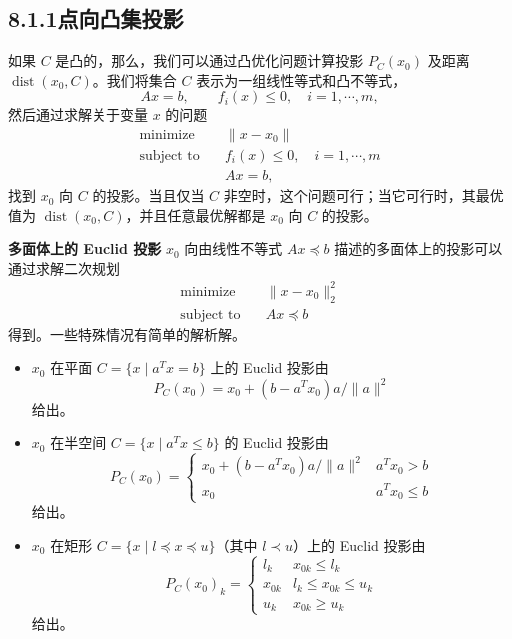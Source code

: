 \documentclass[UTF8,12pt,a4paper,fontset=fandol]{ctexart}
\begin{document}
\subsection*{8.1.1\quad 点向凸集投影}

如果 $C$ 是凸的，那么，我们可以通过凸优化问题计算投影 $P_C(x_0)$ 及距离 $\operatorname{dist}(x_0,C)$。我们将集合 $C$ 表示为一组线性等式和凸不等式，
\begin{equation}
Ax=b,\qquad f_i(x)\leq 0,\quad i=1,\cdots,m,
\tag{8.1}
\end{equation}
然后通过求解关于变量 $x$ 的问题
\begin{equation}
\begin{aligned}
\text{minimize}\quad & \|x-x_0\|\\
\text{subject to}\quad & f_i(x)\leq 0,\quad i=1,\cdots,m\\
& Ax=b,
\end{aligned}
\tag{8.2}
\end{equation}
找到 $x_0$ 向 $C$ 的投影。当且仅当 $C$ 非空时，这个问题可行；当它可行时，其最优值为 $\operatorname{dist}(x_0,C)$，并且任意最优解都是 $x_0$ 向 $C$ 的投影。

\noindent\textbf{多面体上的 Euclid 投影}\quad
$x_0$ 向由线性不等式 $Ax\preceq b$ 描述的多面体上的投影可以通过求解二次规划
\[
\begin{aligned}
\text{minimize}\quad & \|x-x_0\|_2^2\\
\text{subject to}\quad & Ax\preceq b
\end{aligned}
\]
得到。一些特殊情况有简单的解析解。

\begin{itemize}
\item $x_0$ 在平面 $C=\{x\mid a^T x=b\}$ 上的 Euclid 投影由
\[
P_C(x_0)=x_0+(b-a^Tx_0)a/\|a\|^2
\]
给出。

\item $x_0$ 在半空间 $C=\{x\mid a^T x\leq b\}$ 的 Euclid 投影由
\[
P_C(x_0)=
\begin{cases}
x_0+(b-a^Tx_0)a/\|a\|^2 & a^Tx_0>b\\
x_0 & a^Tx_0\leq b
\end{cases}
\]
给出。

\item $x_0$ 在矩形 $C=\{x\mid l\preceq x\preceq u\}$（其中 $l\prec u$）上的 Euclid 投影由
\[
P_C(x_0)_k=
\begin{cases}
l_k & x_{0k}\leq l_k\\
x_{0k} & l_k\leq x_{0k}\leq u_k\\
u_k & x_{0k}\geq u_k
\end{cases}
\]
给出。
\end{itemize}
\end{document}
